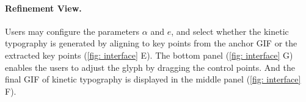 \paragraph{Refinement View.}
Users may configure the parameters $\alpha$ and $e$, and select whether the kinetic typography is generated by aligning to key points from the anchor GIF or the extracted key points (\autoref{fig: interface} E).
The bottom panel (\autoref{fig: interface} G) enables the users to adjust the glyph by dragging the control points.
And the final GIF of kinetic typography is displayed in the middle panel (\autoref{fig: interface} F).


